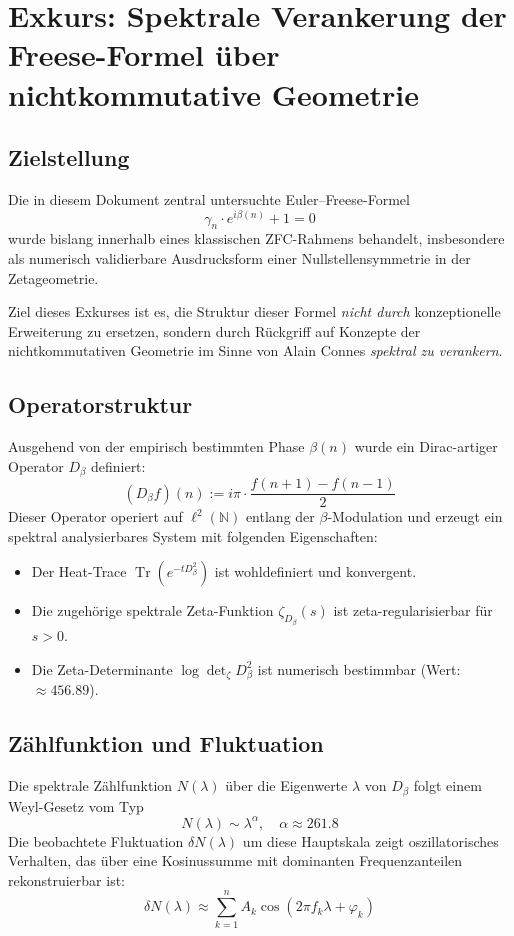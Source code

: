 \section*{Exkurs: Spektrale Verankerung der Freese-Formel über nichtkommutative Geometrie}

\subsection*{Zielstellung}

Die in diesem Dokument zentral untersuchte Euler--Freese-Formel
\[
\gamma_n \cdot e^{i\beta(n)} + 1 = 0
\]
wurde bislang innerhalb eines klassischen ZFC-Rahmens behandelt, insbesondere als numerisch validierbare Ausdrucksform einer Nullstellensymmetrie in der Zetageometrie.

Ziel dieses Exkurses ist es, die Struktur dieser Formel \emph{nicht durch} konzeptionelle Erweiterung zu ersetzen, sondern durch Rückgriff auf Konzepte der nichtkommutativen Geometrie im Sinne von Alain Connes \emph{spektral zu verankern}.

\subsection*{Operatorstruktur}

Ausgehend von der empirisch bestimmten Phase $\beta(n)$ wurde ein Dirac-artiger Operator $D_\beta$ definiert:
\[
(D_\beta f)(n) := i\pi \cdot \frac{f(n+1) - f(n-1)}{2}
\]
Dieser Operator operiert auf $\ell^2(\mathbb{N})$ entlang der $\beta$-Modulation und erzeugt ein spektral analysierbares System mit folgenden Eigenschaften:

\begin{itemize}
    \item Der Heat-Trace $\operatorname{Tr}(e^{-t D_\beta^2})$ ist wohldefiniert und konvergent.
    \item Die zugehörige spektrale Zeta-Funktion $\zeta_{D_\beta}(s)$ ist zeta-regularisierbar für $s > 0$.
    \item Die Zeta-Determinante $\log \det\nolimits_\zeta D_\beta^2$ ist numerisch bestimmbar (Wert: $\approx 456.89$).
\end{itemize}

\subsection*{Zählfunktion und Fluktuation}

Die spektrale Zählfunktion $N(\lambda)$ über die Eigenwerte $\lambda$ von $D_\beta$ folgt einem Weyl-Gesetz vom Typ
\[
N(\lambda) \sim \lambda^\alpha, \quad \alpha \approx 261.8
\]
Die beobachtete Fluktuation $\delta N(\lambda)$ um diese Hauptskala zeigt oszillatorisches Verhalten, das über eine Kosinussumme mit dominanten Frequenzanteilen rekonstruierbar ist:
\[
\delta N(\lambda) \approx \sum_{k=1}^n A_k \cos(2\pi f_k \lambda + \varphi_k)
\]

